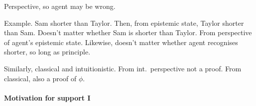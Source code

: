 \begin{note}
  Perspective, so agent may be wrong.

  Example.
  Sam shorter than Taylor.
  Then, from epistemic state, Taylor shorter than Sam.
  Doesn't matter whether Sam is shorter than Taylor.
  From perspective of agent's epistemic state.
  Likewise, doesn't matter whether agent recognises shorter, so long as principle.

  Similarly, classical and intuitionistic.
  From int.\ perspective not a proof.
  From classical, also a proof of \(\phi\).
\end{note}

\paragraph{Motivation for support I}

